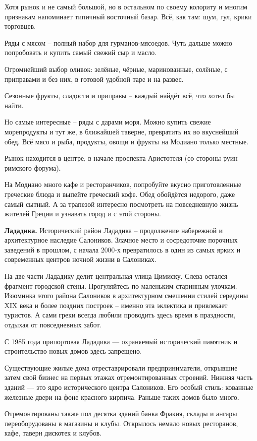 Хотя рынок и не самый большой, но в остальном по своему колориту и многим признакам напоминает типичный восточный базар. Всё, как там: шум, гул, крики торговцев.

Ряды с мясом – полный набор для гурманов-мясоедов. Чуть дальше можно попробовать и купить самый свежий сыр и масло.

Огромнейший выбор оливок: зелёные, чёрные, маринованные, солёные, с приправами и без них, в готовой удобной таре и на развес.

Сезонные фрукты, сладости и приправы – каждый найдёт всё, что хотел бы найти.

Но самые интересные – ряды с дарами моря. Можно купить свежие морепродукты и тут же, в ближайшей таверне, превратить их во вкуснейший обед. Всё мясо и рыба, продукты, овощи и фрукты на Модиано только местные.

Рынок находится в центре, в начале проспекта Аристотеля (со стороны руин римского форума).

На Модиано много кафе и ресторанчиков, попробуйте вкусно приготовленные греческие блюда и выпейте греческий кофе. Обед обойдётся недорого, даже самый сытный. А за трапезой интересно посмотреть на повседневную жизнь жителей Греции и узнавать город и с этой стороны.

\textbf{Лададика.}
Исторический район Лададика – продолжение набережной и архитектурное наследие Салоников. Злачное место и сосредоточие порочных заведений в прошлом, с начала 2000-х превратилось в один из самых ярких и современных центров ночной жизни в Салониках.


На две части Лададику делит центральная улица Цимиску. Слева остался фрагмент городской стены. Прогуляйтесь по маленьким старинным улочкам. Изюминка этого района Салоников в архитектурном смешении стилей середины XIX века и более поздних построек – именно эта эклектика и привлекает туристов. А сами греки всегда любили проводить здесь время в праздности, отдыхая от повседневных забот.

С 1985 года припортовая Лададика — охраняемый исторический памятник и строительство новых домов здесь запрещено.

Существующие жилые дома отреставрировали предприниматели, открывшие затем свой бизнес на первых этажах отремонтированных строений. Нижняя часть зданий — это ядро исторического центра Салоников. Его особый стиль: кованные железные двери на фоне красного кирпича. Раньше таких домов было много.

Отремонтированы также пол десятка зданий банка Фракия, склады и ангары переоборудованы в магазины и клубы. Открылось немало новых ресторанов, кафе, таверн дискотек и клубов.

